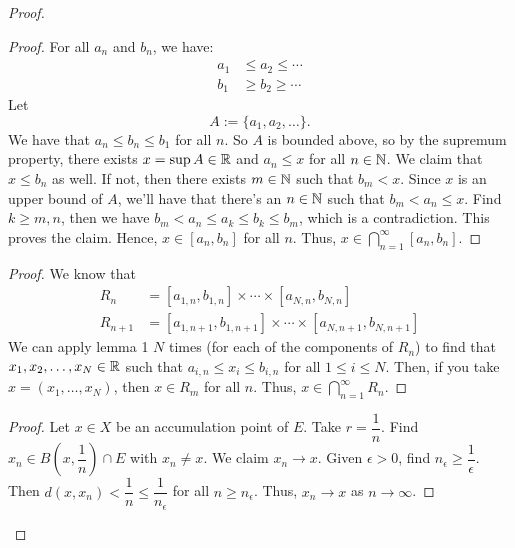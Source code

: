 \documentclass{report}
\begin{document}
\begin{proof}
    \begin{proof}
        For all $a_n$ and $b_n$, we have:
        \begin{align*}
            a_1 &\leq a_2 \leq \cdots \\
            b_1 &\geq b_2 \geq \cdots
        \end{align*}
        Let \[A := \{a_1, a_2, \ldots \}.\] We have that $a_n \leq b_n \leq b_1$ for all $n$. So $A$ is bounded above, so by the supremum property, there exists $x = \sup A \in \RR$ and $a_n \leq x$ for all $n \in \NN$. We claim that $x \leq b_n$ as well. If not, then there exists $m \in \NN$ such that $b_m < x$. Since $x$ is an upper bound of $A$, we'll have that there's an $n \in \NN$ such that $b_m < a_n \leq x$. Find $k \geq m, n$, then we have $b_m < a_n \leq a_k \leq b_k \leq b_m$, which is a contradiction. This proves the claim. Hence, $x \in [a_n, b_n]$ for all $n$. Thus, $x \in \bigcap_{n=1}^\infty [a_n, b_n]$.
    \end{proof}
    \begin{proof}
        We know that \begin{align*}
            R_n &= [a_{1, n}, b_{1, n}] \times \cdots \times [a_{N, n}, b_{N, n}] \\
            R_{n+1} &= [a_{1, n+1}, b_{1, n+1}] \times \cdots \times [a_{N, n+1}, b_{N, n+1}]
        \end{align*}
        We can apply lemma 1 $N$ times (for each of the components of $R_n$) to find that $x_1, x_2, \ldots, x_N \in \RR$ such that $a_{i, n} \leq x_i \leq b_{i, n}$ for all $1 \leq i \leq N$. Then, if you take $x = (x_1, \ldots, x_N)$, then $x \in R_m$ for all $n$. Thus, $x \in \bigcap_{n=1}^\infty R_n$. 
    \end{proof}
    \begin{proof}
        Let $x \in X$ be an accumulation point of $E$. Take $r = \dfrac{1}{n}$. Find $x_n \in B\left(x, \dfrac{1}{n}\right) \cap E$ with $x_n \neq x$. We claim $x_n \to x$. Given $\epsilon >0$, find $n_\epsilon \geq \dfrac{1}{\epsilon}$. Then $d(x, x_n) < \dfrac{1}{n} \leq \dfrac{1}{n_\epsilon}$ for all $n \geq n_\epsilon$. Thus, $x_n \to x$ as $n \to \infty$.


\end{proof}
\end{proof}
\end{document}
